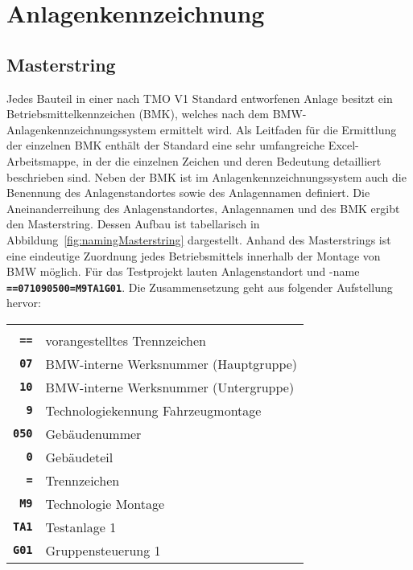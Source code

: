 


\section{Anlagenkennzeichnung}
\label{sec:naming}

\subsection*{Masterstring}
\label{subsec:masterstring}




Jedes Bauteil in einer nach TMO V1 Standard entworfenen Anlage besitzt ein Betriebsmittelkennzeichen (BMK), welches nach dem BMW-Anlagenkennzeichnungssystem ermittelt wird. Als Leitfaden für die Ermittlung der einzelnen BMK enthält der Standard eine sehr umfangreiche Excel-Arbeitsmappe, in der die einzelnen Zeichen und deren Bedeutung detailliert beschrieben sind.
Neben der BMK ist im Anlagenkennzeichnungssystem auch die Benennung des Anlagenstandortes sowie des Anlagennamen definiert. Die Aneinanderreihung des Anlagenstandortes, Anlagennamen und des BMK ergibt den Masterstring. Dessen Aufbau ist tabellarisch in Abbildung~\ref{fig:namingMasterstring} dargestellt. Anhand des Masterstrings ist eine eindeutige Zuordnung jedes Betriebsmittels innerhalb der Montage von BMW möglich.
Für das Testprojekt lauten Anlagenstandort und -name \textbf{\texttt{==071090500=M9TA1G01}}. Die Zusammensetzung geht aus folgender Aufstellung hervor:

\begin{tabularx}{0.92\textwidth}{rX}
  & \\  
  \textbf{\texttt{==}} & vorangestelltes Trennzeichen \\
  \textbf{\texttt{07}} & BMW-interne Werksnummer (Hauptgruppe) \\
  \textbf{\texttt{10}} & BMW-interne Werksnummer (Untergruppe) \\
  \textbf{\texttt{9}} & Technologiekennung Fahrzeugmontage \\
  \textbf{\texttt{050}} & Gebäudenummer \\
  \textbf{\texttt{0}} & Gebäudeteil \\
  \textbf{\texttt{=}} & Trennzeichen \\
  \textbf{\texttt{M9}} & Technologie Montage \\
  \textbf{\texttt{TA1}} & Testanlage 1 \\
  \textbf{\texttt{G01}} & Gruppensteuerung 1
\end{tabularx}


